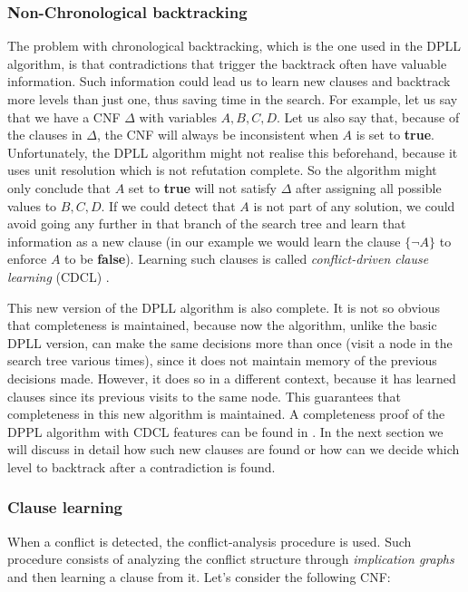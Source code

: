 \documentclass[12pt]{diicc}
\begin{document}
\subsubsection{Non-Chronological backtracking}

The problem with chronological backtracking, which is the one used in the DPLL algorithm, is that contradictions that trigger the backtrack often have valuable information. Such information could lead us to learn new clauses and backtrack more levels than just one, thus saving time in the search. For example, let us say that we have a CNF $\Delta$ with variables $A,B,C,D$. Let us also say that, because of the clauses in $\Delta$, the CNF will always be inconsistent when $A$ is set to \textbf{true}. Unfortunately, the DPLL algorithm might not realise this beforehand, because it uses unit resolution which is not refutation complete. So the algorithm might only conclude that $A$ set to \textbf{true} will not satisfy $\Delta$ after assigning all possible values to $B,C,D$. If we could detect that $A$ is not part of any solution, we could avoid going any further in that branch of the search tree and learn that information as a new clause (in our example we would learn the clause $\{\neg A\}$ to enforce $A$ to be \textbf{false}). Learning such clauses is called \textit{conflict-driven clause learning} (CDCL) \cite{cdcl1,cdcl2}.

This new version of the DPLL algorithm is also complete. It is not so obvious that completeness is maintained, because now the algorithm, unlike the basic DPLL version, can make the same decisions more than once (visit a node in the search tree various times), since it does not maintain memory of the previous decisions made. However, it does so in a different context, because it has learned clauses since its previous visits to the same node. This guarantees that completeness in this new algorithm is maintained. A completeness proof of the DPPL algorithm with CDCL features can be found in \cite{DBLP,ig}. In the next section we will discuss in detail how such new clauses are found or how can we decide which level to backtrack after a contradiction is found.

\subsubsection{Clause learning}

When a conflict is detected, the conflict-analysis procedure is used. Such procedure consists of analyzing the conflict structure through \textit{implication graphs} and then learning a clause from it. Let's consider the following CNF:
\end{document}
